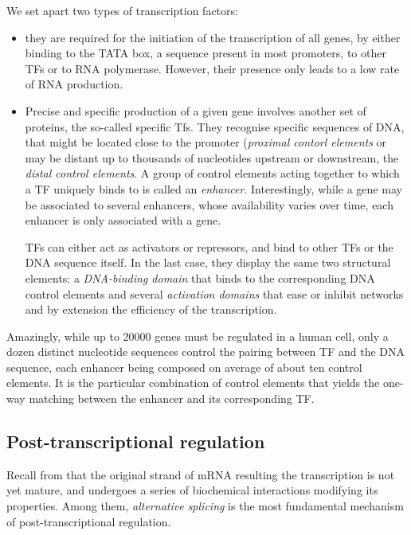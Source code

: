 We set apart two types of transcription factors:
\begin{itemize}
    \item[\textit{General transcription factors}:] they are required for the initiation of the transcription of all genes, by either binding to the TATA box, a sequence present in most promoters, to other TFs or to RNA polymerase. However, their presence only leads to a low rate of RNA production. 
\item[\textit{Specific transcription factors}.] Precise and specific production of a given gene involves another set of proteins, the so-called specific Tfs. They recognise specific sequences of DNA, that might be located close to the promoter (\textit{proximal contorl elements} or may be distant up to thousands of nucleotides upstream or downstream, the \textit{distal control elements}. A group of control elements acting together to which a TF uniquely binds to is called an \textit{enhancer}. Interestingly, while a gene may be associated to several enhancers, whose availability varies over time, each enhancer is only associated with a gene. 

TFs can either act as activators or repressors, and bind to other TFs or the DNA sequence itself. In the last case, they display the same two structural elements: a \textit{DNA-binding domain} that binds to the corresponding DNA control elements and several \textit{activation domains} that ease or inhibit  networks and by extension the efficiency of the transcription. 
\end{itemize}

Amazingly, while up to \num{20000} genes must be regulated in a human cell, only a dozen distinct nucleotide sequences control the pairing between TF and the DNA sequence, each enhancer being composed
on average of about ten control elements. It is the particular combination of control elements that yields the one-way matching between the enhancer and its corresponding TF. 


\subsection{Post-transcriptional regulation}

Recall from  that the original strand of mRNA resulting the transcription is not yet mature, and undergoes a series of biochemical interactions modifying its properties. Among them, \textit{alternative splicing} is the most fundamental mechanism of post-transcriptional regulation. 

